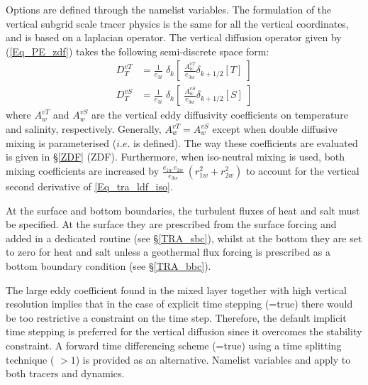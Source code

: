 Options are defined through the   namelist variables.
The formulation of the vertical subgrid scale tracer physics is the same 
for all the vertical coordinates, and is based on a laplacian operator. 
The vertical diffusion operator given by (\ref{Eq_PE_zdf}) takes the 
following semi-discrete space form:
\begin{equation} \label{Eq_tra_zdf}
\begin{split}
D^{vT}_T &= \frac{1}{e_{3t}} \; \delta_k \left[ \;\frac{A^{vT}_w}{e_{3w}}  \delta_{k+1/2}[T] \;\right] 
\\
D^{vS}_T &= \frac{1}{e_{3t}} \; \delta_k \left[ \;\frac{A^{vS}_w}{e_{3w}}  \delta_{k+1/2}[S] \;\right] 
\end{split}
\end{equation}
where $A_w^{vT}$ and $A_w^{vS}$ are the vertical eddy diffusivity 
coefficients on temperature and salinity, respectively. Generally, 
$A_w^{vT}=A_w^{vS}$ except when double diffusive mixing is 
parameterised ($i.e.$  is defined). The way these coefficients 
are evaluated is given in \S\ref{ZDF} (ZDF). Furthermore, when 
iso-neutral mixing is used, both mixing coefficients are increased 
by $\frac{e_{1w}\,e_{2w} }{e_{3w} }\ \left( {r_{1w} ^2+r_{2w} ^2} \right)$ 
to account for the vertical second derivative of \eqref{Eq_tra_ldf_iso}. 

At the surface and bottom boundaries, the turbulent fluxes of 
heat and salt must be specified. At the surface they are prescribed 
from the surface forcing and added in a dedicated routine (see \S\ref{TRA_sbc}), 
whilst at the bottom they are set to zero for heat and salt unless 
a geothermal flux forcing is prescribed as a bottom boundary 
condition (see \S\ref{TRA_bbc}). 

The large eddy coefficient found in the mixed layer together with high 
vertical resolution implies that in the case of explicit time stepping 
(=true) there would be too restrictive a constraint on 
the time step. Therefore, the default implicit time stepping is preferred 
for the vertical diffusion since it overcomes the stability constraint. 
A forward time differencing scheme (=true) using a time 
splitting technique ( $> 1$) is provided as an alternative. 
Namelist variables  and  apply to both 
tracers and dynamics. 

